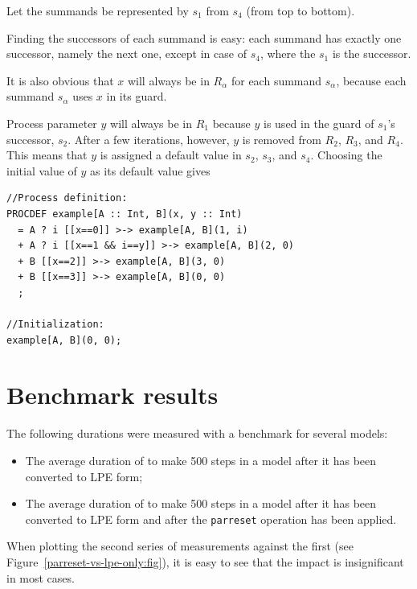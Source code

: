 Let the summands be represented by $s_1$ from $s_4$ (from top to bottom).

Finding the successors of each summand is easy: each summand has exactly one successor, namely the next one, except in case of $s_4$, where the $s_1$ is the successor.

It is also obvious that $x$ will always be in $R_\alpha$ for each summand $s_\alpha$, because each summand $s_\alpha$ uses $x$ in its guard.

Process parameter $y$ will always be in $R_1$ because $y$ is used in the guard of $s_1$'s successor, $s_2$.
After a few iterations, however, $y$ is removed from $R_2$, $R_3$, and $R_4$.
This means that $y$ is assigned a default value in $s_2$, $s_3$, and $s_4$.
Choosing the initial value of $y$ as its default value gives

\begin{lstlisting}
//Process definition:
PROCDEF example[A :: Int, B](x, y :: Int)
  = A ? i [[x==0]] >-> example[A, B](1, i)
  + A ? i [[x==1 && i==y]] >-> example[A, B](2, 0)
  + B [[x==2]] >-> example[A, B](3, 0)
  + B [[x==3]] >-> example[A, B](0, 0)
  ;

//Initialization:
example[A, B](0, 0);
\end{lstlisting}

\section{Benchmark results}

The following durations were measured with a benchmark for several models:
\begin{itemize}
\item The average duration of \txs{} to make 500 steps in a model after it has been converted to LPE form;
\item The average duration of \txs{} to make 500 steps in a model after it has been converted to LPE form and after the \texttt{parreset} operation has been applied.
\end{itemize}

When plotting the second series of measurements against the first (see Figure~\ref{parreset-vs-lpe-only:fig}), it is easy to see that the impact is insignificant in most cases.

